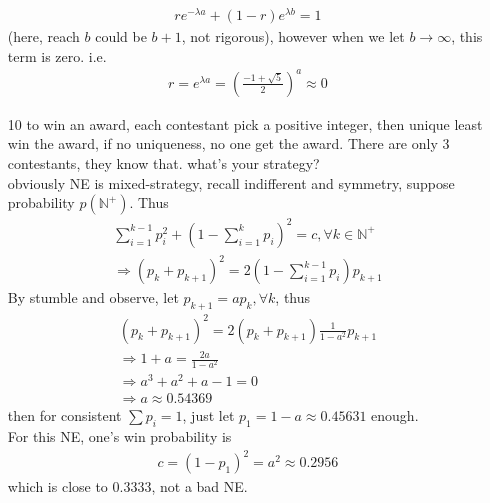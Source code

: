 \documentclass[paper=a4, fontsize=11pt]{scrartcl} %
\numberwithin{equation}{section} %
\numberwithin{figure}{section} %
\numberwithin{table}{section} %
\begin{document}
\begin{itemize}
	\begin{align}
		r e^{-\lambda a}+(1-r)e^{\lambda b}=1
	\end{align}
	(here, reach $b$ could be $b+1$, not rigorous), however when we let $b\rightarrow\infty$, this term is zero. i.e.
	\begin{align}
		r = e^{\lambda a}=(\frac{-1+\sqrt{5}}{2})^a\approx 0
	\end{align}
	\item[10] to win an award, each contestant pick a positive integer, then unique least win the award, if no uniqueness, no one get the award. There are only $3$ contestants, they know that. what's your strategy?\\
	obviously NE is mixed-strategy, recall indifferent and symmetry, suppose probability $p(\mathbb{N}^+)$. Thus
	\begin{align}
		\sum_{i=1}^{k-1} p_i^2 + \left(1-\sum_{i=1}^k p_i\right)^2 = c, \forall k\in\mathbb{N}^+\\
		\Rightarrow (p_k+p_{k+1})^2 = 2(1-\sum_{i=1}^{k-1}p_i)p_{k+1}
	\end{align}
	By stumble and observe, let $p_{k+1}=a p_k,\forall k$, thus
	\begin{align}
		(p_k+p_{k+1})^2 = 2(p_k+p_{k+1})\frac{1}{1-a^2}p_{k+1}\\
		\Rightarrow 1 + a = \frac{2a}{1-a^2}\\
		\Rightarrow a^3+a^2+a-1=0\\
		\Rightarrow a\approx 0.54369
	\end{align}
	then for consistent $\sum p_i=1$, just let $p_1=1-a\approx 0.45631$ enough.\\
	For this NE, one's win probability is
	\begin{align}
		c = (1-p_1)^2=a^2\approx 0.2956
	\end{align}
	which is close to $0.3333$, not a bad NE.
\end{itemize}
\end{document}
